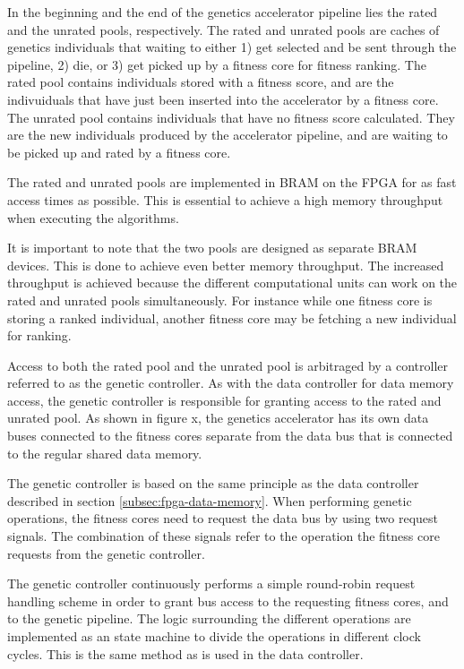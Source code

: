 In the beginning and the end of the genetics accelerator pipeline lies the rated and the unrated pools, respectively.
The rated and unrated pools are caches of genetics individuals that waiting to either 1) get selected and be sent through the pipeline, 2) die, or 3) get picked up by a fitness core for fitness ranking.
The rated pool contains individuals stored with a fitness score, and are the indivuiduals that have just been inserted into the accelerator by a fitness core.
The unrated pool contains individuals that have no fitness score calculated.
They are the new individuals produced by the accelerator pipeline, and are waiting to be picked up and rated by a fitness core.

The rated and unrated pools are implemented in \gls{BRAM} on the FPGA for as fast access times as possible.
This is essential to achieve a high memory throughput when executing the algorithms.

It is important to note that the two pools are designed as separate \gls{BRAM} devices.
This is done to achieve even better memory throughput.
The increased throughput is achieved because the different computational units can work on the rated and unrated pools simultaneously.
For instance while one fitness core is storing a ranked individual, another fitness core may be fetching a new individual for ranking. 

Access to both the rated pool and the unrated pool is arbitraged by a controller referred to as the \gls{genetic controller}.
As with the \gls{data controller} for data memory access, the \gls{genetic controller} is responsible for granting access to the rated and unrated pool.
As shown in figure x\cn{}, the genetics accelerator has its own data buses connected to the fitness cores separate from the data bus that is connected to the regular shared data memory.

The \gls{genetic controller} is based on the same principle as the \gls{data controller} described in section \vref{subsec:fpga-data-memory}.
When performing genetic operations, the fitness cores need to request the data bus by using two request signals.
The combination of these signals refer to the operation the fitness core requests from the genetic controller. 

The genetic controller continuously performs a simple round-robin request handling scheme in order to grant bus access to the requesting fitness cores, and to the genetic pipeline.
The logic surrounding the different operations are implemented as an state machine to divide the operations in different clock cycles.
This is the same method as is used in the data controller.

